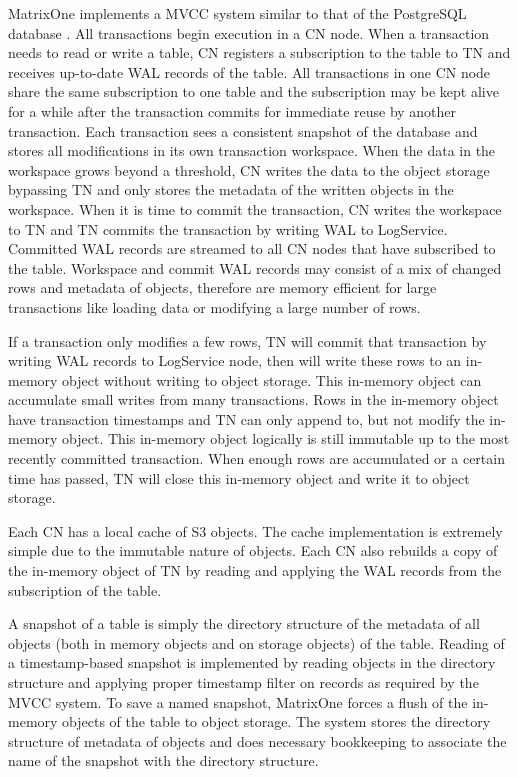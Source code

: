 \documentclass[sigconf,nonacm]{acmart} %
\begin{document}
MatrixOne implements a MVCC system similar to that of the PostgreSQL database \cite{PostgreSQL}.  
All transactions begin execution in a CN node.  When a transaction needs to 
read or write a table, CN registers a subscription to the table to TN and
receives up-to-date WAL records of the table.  All transactions in one CN node
share the same subscription to one table and the subscription may be kept
alive for a while after the transaction commits for immediate reuse by 
another transaction.
Each transaction sees a consistent snapshot of the database and stores 
all modifications in its own transaction workspace.  
When the data in the workspace grows beyond a threshold, CN 
writes the data to the object storage bypassing TN and only stores 
the metadata of the written objects in the workspace.  
When it is time to commit the transaction, CN writes the workspace to TN and 
TN commits the transaction by writing WAL to LogService.  
Committed WAL records are streamed to all CN nodes that have 
subscribed to the table.  Workspace and commit WAL records may consist of
a mix of changed rows and metadata of objects, therefore are memory efficient 
for large transactions like loading data or modifying a large number of rows.

If a transaction only modifies a few rows, TN will commit that transaction by
writing WAL records to LogService node, then will write these rows  
to an in-memory object without writing to object storage.  This in-memory object
can accumulate small writes from many transactions.  Rows in the in-memory 
object have transaction timestamps and TN can only append to, but not modify 
the in-memory object.  This in-memory object logically is still immutable up 
to the most recently committed transaction.  When enough rows are accumulated 
or a certain time has passed, TN will close this in-memory object and write 
it to object storage.  

Each CN has a local cache of S3 objects.  The cache implementation 
is extremely simple due to the immutable nature of objects.  Each CN
also rebuilds a copy of the in-memory object of TN by reading
and applying the WAL records from the subscription of the table.

A snapshot of a table is simply the directory structure of 
the metadata of all objects (both in memory objects and 
on storage objects) of the table.  Reading of a timestamp-based 
snapshot is implemented by reading objects in the directory 
structure and applying proper timestamp filter on records as required 
by the MVCC system.  To save a named snapshot, MatrixOne forces 
a flush of the in-memory objects of the table to object storage.  
The system stores the directory structure of metadata of objects 
and does necessary bookkeeping to associate the name of the 
snapshot with the directory structure.
\end{document}
